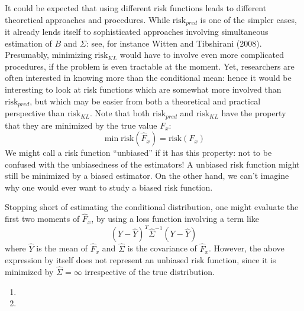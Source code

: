 \documentclass[12pt]{article}
\begin{document}
It could be expected that using different risk functions leads to
different theoretical approaches and procedures.  While
$\text{risk}_{pred}$ is one of the simpler cases, it already lends
itself to sophisticated approaches involving simultaneous estimation
of $B$ and $\Sigma$: see, for instance Witten and Tibshirani (2008).
Presumably, minimizing $\text{risk}_{KL}$ would have to involve even
more complicated procedures, if the problem is even tractable at the
moment.  Yet, researchers are often interested in knowing more than
the conditional mean: hence it would be interesting to look at risk
functions which are somewhat more involved than $\text{risk}_{pred}$,
but which may be easier from both a theoretical and practical
perspective than $\text{risk}_{KL}$.  Note that both
$\text{risk}_{pred}$ and $\text{risk}_{KL}$ have the property that
they are minimized by the true value $F_x$:
\[
\min \text{risk}(\hat{F}_x) = \text{risk}(F_x)
\]
We might call a risk function ``unbiased'' if it has this property:
not to be confused with the unbiasedness of the estimators!  A
unbiased risk function might still be minimized by a biased estimator.
On the other hand, we can't imagine why one would ever want to study a
biased risk function.

Stopping short of estimating the conditional distribution, one might
evaluate the first two moments of $\hat{F}_x$, by using a loss function involving a term like
\[
(Y - \hat{Y})^T \hat{\Sigma}^{-1} (Y - \hat{Y})
\]
where $\hat{Y}$ is the mean of $\hat{F}_x$ and $\hat{\Sigma}$ is the
covariance of $\hat{F}_x$.  However, the above expression by itself
does not represent an unbiased risk function, since it is minimized by
$\hat{\Sigma} = \infty$ irrespective of the true distribution.


\begin{enumerate}
\item 
\item 
\end{enumerate}
\end{document}
